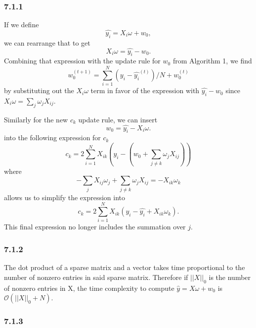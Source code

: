 \documentclass[12pt]{amsart}
\begin{document}
\subsubsection*{7.1.1}
If we define
\begin{equation}
\hat{y_i} = X_i \omega + w_0,
\end{equation}
we can rearrange that to get 
\begin{equation}
X_i \omega = \hat{y_i} - w_0.
\end{equation}
Combining that expression with the update rule for $w_0$ from Algorithm 1, we find
\begin{equation}
w_0^{(t+1)} = \sum_{i = 1}^N (y_i - \hat{y_i}^{(t)})/N + w_0^{(t)}
\end{equation}
by substituting out the $X_i \omega$ term in favor of the expression with $\hat{y_i} - w_0$ since $X_i \omega = \sum_j \omega_j X_{ij}$.

Similarly for the new $c_k$ update rule, we can insert
\begin{equation}
w_0 = \hat{y_i} - X_i \omega.
\end{equation}
into the following expression for $c_k$
\begin{equation}
c_k = 2 \sum_{i=1}^N X_{ik}(y_i - (w_0 + \sum_{j \neq k}\omega_j X_{ij}))
\end{equation}
where 
\begin{equation}
-\sum_j X_{ij}\omega_j + \sum_{j \neq k}\omega_j X_{ij} = -X_{ik}\omega_k
\end{equation}
allows us to simplify the expression into 
\begin{equation}
c_k = 2 \sum_{i=1}^N X_{ik}(y_i - \hat{y_i} + X_{ik}\omega_k).
\end{equation}
This final expression no longer includes the summation over $j$.

\subsubsection*{7.1.2}
The dot product of a sparse matrix and a vector takes time proportional to the number of nonzero entries in said sparse matrix.  Therefore if $||X||_0$ is the number of nonzero entries in X, the time complexity to compute $\hat{y} = X\omega + w_0$ is $\mathcal{O}(||X||_0 + N)$.

\subsubsection*{7.1.3}
\end{document}
